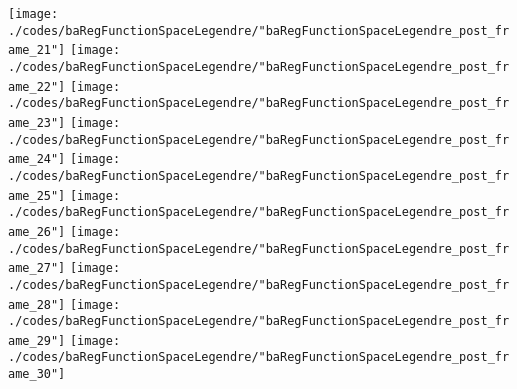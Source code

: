 \begin{frame}{\insertsection}
\begin{center}
{\begin{animateinline}{20}
				 \texttt{[image: ./codes/baRegFunctionSpaceLegendre/"baRegFunctionSpaceLegendre\_post\_frame\_21"]}\newframe
				 \texttt{[image: ./codes/baRegFunctionSpaceLegendre/"baRegFunctionSpaceLegendre\_post\_frame\_22"]}\newframe
				 \texttt{[image: ./codes/baRegFunctionSpaceLegendre/"baRegFunctionSpaceLegendre\_post\_frame\_23"]}\newframe
				 \texttt{[image: ./codes/baRegFunctionSpaceLegendre/"baRegFunctionSpaceLegendre\_post\_frame\_24"]}\newframe
				 \texttt{[image: ./codes/baRegFunctionSpaceLegendre/"baRegFunctionSpaceLegendre\_post\_frame\_25"]}\newframe
				 \texttt{[image: ./codes/baRegFunctionSpaceLegendre/"baRegFunctionSpaceLegendre\_post\_frame\_26"]}\newframe
				 \texttt{[image: ./codes/baRegFunctionSpaceLegendre/"baRegFunctionSpaceLegendre\_post\_frame\_27"]}\newframe
				 \texttt{[image: ./codes/baRegFunctionSpaceLegendre/"baRegFunctionSpaceLegendre\_post\_frame\_28"]}\newframe
				 \texttt{[image: ./codes/baRegFunctionSpaceLegendre/"baRegFunctionSpaceLegendre\_post\_frame\_29"]}\newframe
				 \texttt{[image: ./codes/baRegFunctionSpaceLegendre/"baRegFunctionSpaceLegendre\_post\_frame\_30"]}
			 \end{animateinline}
			}
	\end{center}
    
\end{frame}


